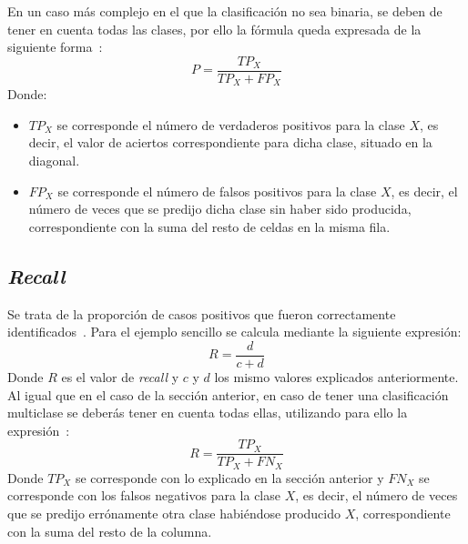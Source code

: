 En un caso más complejo en el que la clasificación no sea binaria, se deben de tener en cuenta todas las clases, por ello la fórmula queda expresada de la siguiente forma~\cite{metrics2}:
$$P = \frac{TP_X}{TP_X + FP_X} $$
Donde:
\begin{itemize}
	\item $TP_X$ se corresponde el número de verdaderos positivos para la clase $X$, es decir, el valor de aciertos correspondiente para dicha clase, situado en la diagonal.
	\item $FP_X$ se corresponde el número de falsos positivos para la clase $X$, es decir, el número de veces que se predijo dicha clase sin haber sido producida, correspondiente con la suma del resto de celdas en la misma fila.
\end{itemize}

\subsection{\textit{Recall}}
Se trata de la proporción de casos positivos que fueron correctamente identificados~\cite{metrics}. Para el ejemplo sencillo se calcula mediante la siguiente expresión:
$$R = \frac{d}{c+d} $$
Donde $R$ es el valor de \textit{recall} y $c$ y $d$ los mismo valores explicados anteriormente.\\

Al igual que en el caso de la sección anterior, en caso de tener una clasificación multiclase se deberás tener en cuenta todas ellas, utilizando para ello la expresión~\cite{metrics2}:
$$R = \frac{TP_X}{TP_X +FN_X} $$
Donde $TP_X$ se corresponde con lo explicado en la sección anterior y $FN_X$ se corresponde con los falsos negativos para la clase $X$, es decir, el número de veces que se predijo errónamente otra clase habiéndose producido $X$, correspondiente con la suma del resto de la columna. 
